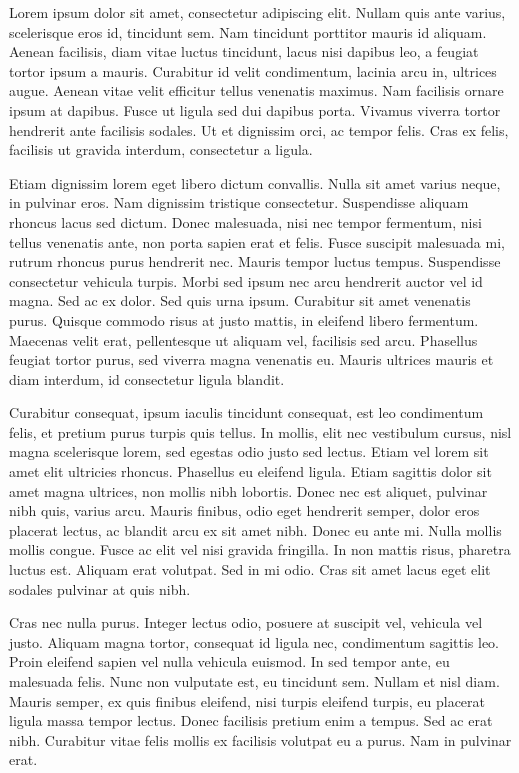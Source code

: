 					Lorem ipsum dolor sit amet, consectetur adipiscing elit. Nullam quis ante varius, scelerisque eros id, tincidunt sem. Nam tincidunt porttitor mauris id aliquam. Aenean facilisis, diam vitae luctus tincidunt, lacus nisi dapibus leo, a feugiat tortor ipsum a mauris. Curabitur id velit condimentum, lacinia arcu in, ultrices augue. Aenean vitae velit efficitur tellus venenatis maximus. Nam facilisis ornare ipsum at dapibus. Fusce ut ligula sed dui dapibus porta. Vivamus viverra tortor hendrerit ante facilisis sodales. Ut et dignissim orci, ac tempor felis. Cras ex felis, facilisis ut gravida interdum, consectetur a ligula.

					Etiam dignissim lorem eget libero dictum convallis. Nulla sit amet varius neque, in pulvinar eros. Nam dignissim tristique consectetur. Suspendisse aliquam rhoncus lacus sed dictum. Donec malesuada, nisi nec tempor fermentum, nisi tellus venenatis ante, non porta sapien erat et felis. Fusce suscipit malesuada mi, rutrum rhoncus purus hendrerit nec. Mauris tempor luctus tempus. Suspendisse consectetur vehicula turpis. Morbi sed ipsum nec arcu hendrerit auctor vel id magna. Sed ac ex dolor. Sed quis urna ipsum. Curabitur sit amet venenatis purus. Quisque commodo risus at justo mattis, in eleifend libero fermentum. Maecenas velit erat, pellentesque ut aliquam vel, facilisis sed arcu. Phasellus feugiat tortor purus, sed viverra magna venenatis eu. Mauris ultrices mauris et diam interdum, id consectetur ligula blandit.

					Curabitur consequat, ipsum iaculis tincidunt consequat, est leo condimentum felis, et pretium purus turpis quis tellus. In mollis, elit nec vestibulum cursus, nisl magna scelerisque lorem, sed egestas odio justo sed lectus. Etiam vel lorem sit amet elit ultricies rhoncus. Phasellus eu eleifend ligula. Etiam sagittis dolor sit amet magna ultrices, non mollis nibh lobortis. Donec nec est aliquet, pulvinar nibh quis, varius arcu. Mauris finibus, odio eget hendrerit semper, dolor eros placerat lectus, ac blandit arcu ex sit amet nibh. Donec eu ante mi. Nulla mollis mollis congue. Fusce ac elit vel nisi gravida fringilla. In non mattis risus, pharetra luctus est. Aliquam erat volutpat. Sed in mi odio. Cras sit amet lacus eget elit sodales pulvinar at quis nibh.

					Cras nec nulla purus. Integer lectus odio, posuere at suscipit vel, vehicula vel justo. Aliquam magna tortor, consequat id ligula nec, condimentum sagittis leo. Proin eleifend sapien vel nulla vehicula euismod. In sed tempor ante, eu malesuada felis. Nunc non vulputate est, eu tincidunt sem. Nullam et nisl diam. Mauris semper, ex quis finibus eleifend, nisi turpis eleifend turpis, eu placerat ligula massa tempor lectus. Donec facilisis pretium enim a tempus. Sed ac erat nibh. Curabitur vitae felis mollis ex facilisis volutpat eu a purus. Nam in pulvinar erat.

